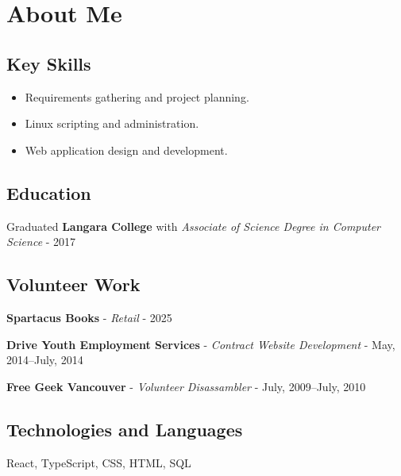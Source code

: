 \documentclass[oneside]{scrartcl}
\begin{document}
\section{About Me}

\begin{multicols}{2}

\subsection{Key Skills}

\begin{itemize}[nosep]
\item Requirements gathering and project planning.
\item Linux scripting and administration.
\item Web application design and development.
\end{itemize}

\subsection{Education}

Graduated {\large \textbf{Langara College}} with \textit{Associate of
Science Degree in Computer Science} - 2017

\subsection{Volunteer Work}

\textbf{Spartacus Books} - \textit{Retail} - 2025

\textbf{Drive Youth Employment Services} - \textit{Contract Website Development} - May, 2014--July, 2014

\textbf{Free Geek Vancouver} - \textit{Volunteer Disassambler} - July, 2009--July, 2010

\subsection{Technologies and Languages}

React, TypeScript, CSS, HTML, SQL

\end{multicols}
\end{document}
